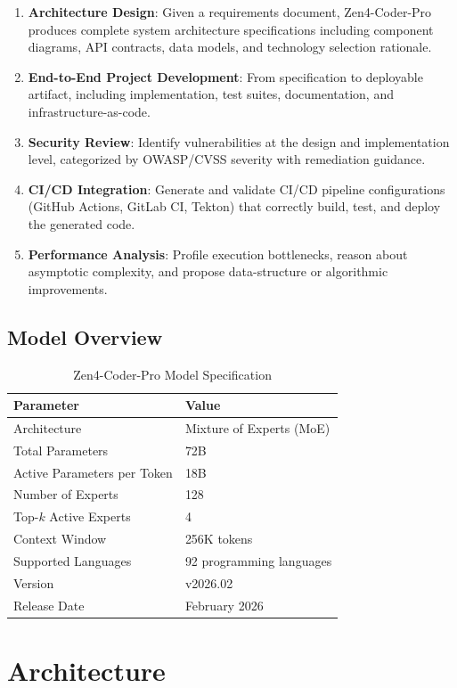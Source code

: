 \documentclass[11pt,a4paper]{article}
\begin{document}
\begin{enumerate}
  \item \textbf{Architecture Design}: Given a requirements document, Zen4-Coder-Pro produces complete system architecture specifications including component diagrams, API contracts, data models, and technology selection rationale.
  \item \textbf{End-to-End Project Development}: From specification to deployable artifact, including implementation, test suites, documentation, and infrastructure-as-code.
  \item \textbf{Security Review}: Identify vulnerabilities at the design and implementation level, categorized by OWASP/CVSS severity with remediation guidance.
  \item \textbf{CI/CD Integration}: Generate and validate CI/CD pipeline configurations (GitHub Actions, GitLab CI, Tekton) that correctly build, test, and deploy the generated code.
  \item \textbf{Performance Analysis}: Profile execution bottlenecks, reason about asymptotic complexity, and propose data-structure or algorithmic improvements.
\end{enumerate}

\subsection{Model Overview}

\begin{table}[H]
\centering
\caption{Zen4-Coder-Pro Model Specification}
\begin{tabular}{ll}
\toprule
\textbf{Parameter} & \textbf{Value} \\
\midrule
Architecture & Mixture of Experts (MoE) \\
Total Parameters & 72B \\
Active Parameters per Token & 18B \\
Number of Experts & 128 \\
Top-$k$ Active Experts & 4 \\
Context Window & 256K tokens \\
Supported Languages & 92 programming languages \\
Version & v2026.02 \\
Release Date & February 2026 \\
\bottomrule
\end{tabular}
\end{table}

\section{Architecture}
\end{document}

